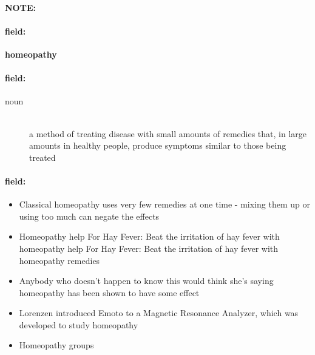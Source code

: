 \documentclass[12pt]{article}
\newenvironment{note}{\paragraph{NOTE:}}{}
\newenvironment{field}{\paragraph{field:}}{}
\begin{document}
\begin{note}
\begin{field}
\textbf{\large homeopathy}
\end{field}


\begin{field}
\begin{description}
\item[noun] \hfill \\ 
a method of treating disease with small amounts of remedies that, in large amounts in healthy people, produce symptoms similar to those being treated

\end{description}
\end{field}

\begin{field}
\begin{itemize}
\item Classical homeopathy uses very few remedies at one time - mixing them up or using too much can negate the effects
\item Homeopathy help For Hay Fever: Beat the irritation of hay fever with homeopathy help For Hay Fever: Beat the irritation of hay fever with homeopathy remedies
\item Anybody who doesn't happen to know this would think she's saying homeopathy has been shown to have some effect
\item Lorenzen introduced Emoto to a Magnetic Resonance Analyzer, which was developed to study homeopathy
\item Homeopathy groups
\end{itemize}
\end{field}
\end{note}
\end{document}
